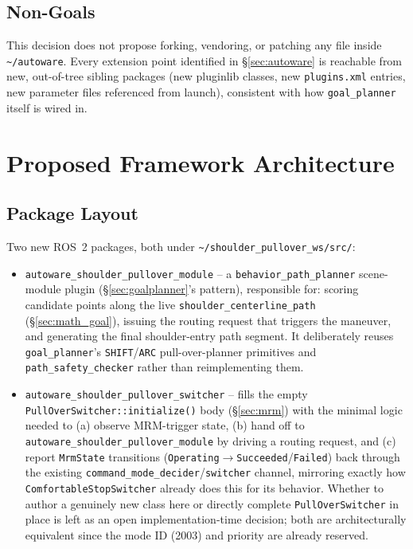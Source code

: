 \documentclass[11pt]{article}
\newcommand{\code}[1]{\texttt{#1}}
\newcommand{\pkg}[1]{\texttt{#1}}
\begin{document}
\subsection{Non-Goals}
This decision does not propose forking, vendoring, or patching any file inside
\code{\textasciitilde/autoware}. Every extension point identified in \S\ref{sec:autoware} is reachable
from new, out-of-tree sibling packages (new pluginlib classes, new \code{plugins.xml} entries, new
parameter files referenced from launch), consistent with how \pkg{goal\_planner} itself is wired in.

\section{Proposed Framework Architecture}
\label{sec:framework}

\subsection{Package Layout}
Two new ROS~2 packages, both under \code{\textasciitilde/shoulder\_pullover\_ws/src/}:

\begin{itemize}[leftmargin=1.6em]
  \item \pkg{autoware\_shoulder\_pullover\_module} -- a \pkg{behavior\_path\_planner} scene-module
  plugin (\S\ref{sec:goalplanner}'s pattern), responsible for: scoring candidate points along the
  live \code{shoulder\_centerline\_path} (\S\ref{sec:math_goal}), issuing the routing request that
  triggers the maneuver, and generating the final shoulder-entry path segment. It deliberately reuses
  \pkg{goal\_planner}'s \code{SHIFT}/\code{ARC} pull-over-planner primitives and
  \pkg{path\_safety\_checker} rather than reimplementing them.
  \item \pkg{autoware\_shoulder\_pullover\_switcher} -- fills the empty
  \code{PullOverSwitcher::initialize()} body (\S\ref{sec:mrm}) with the minimal logic needed to (a)
  observe MRM-trigger state, (b) hand off to \pkg{autoware\_shoulder\_pullover\_module} by driving a
  routing request, and (c) report \code{MrmState} transitions
  (\code{Operating}$\to$\code{Succeeded}/\code{Failed}) back through the existing
  \code{command\_mode\_decider}/\code{switcher} channel, mirroring exactly how
  \code{ComfortableStopSwitcher} already does this for its behavior. Whether to author a genuinely
  new class here or directly complete \code{PullOverSwitcher} in place is left as an open
  implementation-time decision; both are architecturally equivalent since the mode ID (2003) and
  priority are already reserved.
\end{itemize}
\end{document}
